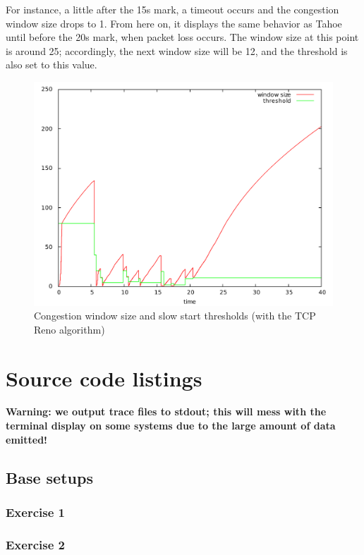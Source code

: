 \documentclass[10pt,a4paper]{article}
\begin{document}
For instance, a little after the 15s mark, a timeout occurs and the
congestion window size drops to 1. From here on, it displays the same
behavior as Tahoe until before the 20s mark, when packet loss occurs.
The window size at this point is around 25; accordingly, the next
window size will be 12, and the threshold is also set to this value.
\begin{figure}[p]
    \centering
    \includegraphics[width=\textwidth]{../part2/q4/plots/algorithm.pdf}
    \caption{Congestion window size and slow start thresholds (with
      the TCP Reno algorithm)}
    \label{fig:aimd_reno}
\end{figure}


\newpage
\section{Source code listings}

\textbf{Warning: we output trace files to stdout; this will mess with
  the terminal display on some systems due to the large amount of data
emitted!}

\subsection{Base setups}
\subsubsection{Exercise 1}

\subsubsection{Exercise 2}

\end{document}
